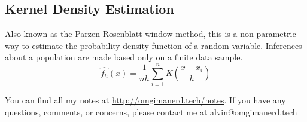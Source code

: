 \documentclass{math}
\begin{document}
\subsection*{Kernel Density Estimation}
Also known as the Parzen-Rosenblatt window method, this is a non-parametric way
to estimate the probability density function of a random variable. Inferences
about a population are made based only on a finite data sample.
\[ \hat{f_h}(x) = \frac{1}{nh}\sum_{i=1}^{n}K\left(\frac{x-x_i}{h}\right) \]

\begin{center}
  You can find all my notes at \url{http://omgimanerd.tech/notes}. If you have
  any questions, comments, or concerns, please contact me at
  alvin@omgimanerd.tech
\end{center}
\end{document}
